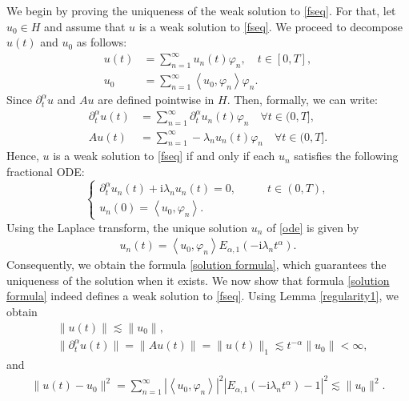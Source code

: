 \documentclass[reqno]{amsart}
\makeatletter
\renewenvironment{proof}[1][\proofname]{\par
  \pushQED{\qed}%
  \normalfont \topsep6\p@\@plus6\p@\relax
  \trivlist
  \item[\hskip\labelsep\bfseries #1\@addpunct{.}]%
}{%
  \popQED\endtrivlist\@endpefalse
}
\numberwithin{equation}{section}
\makeatother
\begin{document}
\begin{proof}
	We begin by proving the uniqueness of the weak solution to \eqref{fseq}. For that, let $u_0\in H$ and assume that $u$ is a weak solution to \eqref{fseq}. We proceed to decompose 
	$u(t)$ and $u_0$ as follows:
	\begin{align*}
		u(t)&=\sum_{n=1}^{\infty}u_n(t)\varphi_n,\quad t\in [0,T],\\
		u_0&=\sum_{n=1}^{\infty}\left\langle u_0, \varphi_n\right\rangle\varphi_n.
	\end{align*}
    Since $\partial_t^{\alpha}u$ and $Au$ are defined pointwise in $H$.
	Then, formally, we can write:
	\begin{align}
		\partial_t^\alpha u(t)&=\sum_{n=1}^{\infty}\partial_t^\alpha u_n(t)\varphi_n\quad \forall t\in (0,T], \label{serie1}\\
		Au(t)&=\sum_{n=1}^{\infty}-\lambda_{n}u_n(t)\varphi_n\quad \forall t\in (0,T]. \label{serie2}
	\end{align}
	Hence, $u$ is a weak solution to \eqref{fseq} 
if and only if each $u_n$ satisfies the following fractional ODE:
	\begin{equation}\label{ode}
		\begin{cases}
			\partial_t^\alpha u_n(t) + \mathrm{i} \lambda_{n}u_n(t) = 0, &\qquad t \in (0,T),\\
			u_n(0)=\left\langle u_0, \varphi_n\right\rangle.
		\end{cases}
	\end{equation}
	Using the Laplace transform, the unique solution $u_n$ of \eqref{ode} is given by
	\begin{align*}
		u_n(t)=\left\langle u_0, \varphi_n\right\rangle E_{\alpha,1}(-\mathrm{i} \lambda_{n} t^{\alpha}).
	\end{align*}
	Consequently, we obtain the formula \eqref{solution formula}, which guarantees the uniqueness of the solution when it exists. We now show that formula \eqref{solution formula} indeed defines a weak solution to \eqref{fseq}. Using Lemma \ref{regularity1}, we obtain
	\begin{align}
		&\|u(t)\|\lesssim \|u_0\|, \nonumber\\
		&\|\partial_{t}^{\alpha}u(t)\|=\|Au(t)\|=\|u(t)\|_1\lesssim t^{-\alpha}\|u_0\|<\infty \nonumber,
	\end{align} 
	and 
	\begin{align}
		\|u(t)-u_0\|^2=\sum_{n=1}^{\infty}|\left\langle u_0, \varphi_n\right\rangle|^2 |E_{\alpha, 1}\left(-\mathrm{i}\lambda_n t^\alpha\right)-1|^2\lesssim \|u_0\|^2. \nonumber

\end{align}
\end{proof}
\end{document}
